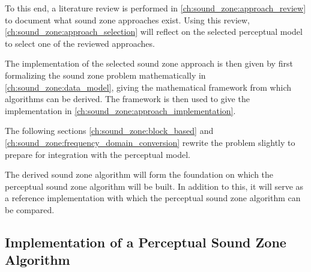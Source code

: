 To this end, a literature review is performed in \autoref{ch:sound_zone:approach_review} to document what sound zone approaches exist.
Using this review, \autoref{ch:sound_zone:approach_selection} will reflect on the selected perceptual model to select one of the 
reviewed approaches.

The implementation of the selected sound zone approach is then given by first formalizing the sound zone problem mathematically in 
\autoref{ch:sound_zone:data_model}, giving the mathematical framework from which algorithms can be derived.
The framework is then used to give the implementation in \autoref{ch:sound_zone:approach_implementation}.

The following sections \autoref{ch:sound_zone:block_based} and \autoref{ch:sound_zone:frequency_domain_conversion} rewrite the problem slightly to 
prepare for integration with the perceptual model.

The derived sound zone algorithm will form the foundation on which the perceptual sound zone algorithm will be built.
In addition to this, it will serve as a reference implementation with which the perceptual sound zone algorithm
can be compared.

\subsection{Implementation of a Perceptual Sound Zone Algorithm}
\label{ch:introduction:objectives:perceptual_sound_zone}
